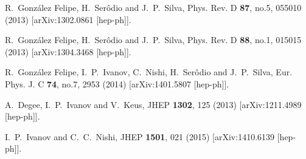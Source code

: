 \documentclass[11pt]{article}
\begin{document}
\begin{thebibliography}{99}
R.~González Felipe, H.~Serôdio and J.~P.~Silva,
Phys. Rev. D \textbf{87}, no.5, 055010 (2013)
[arXiv:1302.0861 [hep-ph]].

R.~González Felipe, H.~Serôdio and J.~P.~Silva,
Phys. Rev. D \textbf{88}, no.1, 015015 (2013)
[arXiv:1304.3468 [hep-ph]].

R.~González Felipe, I.~P.~Ivanov, C.~Nishi, H.~Serôdio and J.~P.~Silva,
Eur. Phys. J. C \textbf{74}, no.7, 2953 (2014)
[arXiv:1401.5807 [hep-ph]].

A.~Degee, I.~P.~Ivanov and V.~Keus,
JHEP {\bf 1302}, 125 (2013)
[arXiv:1211.4989 [hep-ph]].

I.~P.~Ivanov and C.~C.~Nishi,
JHEP {\bf 1501}, 021 (2015)
[arXiv:1410.6139 [hep-ph]].

\end{thebibliography}
\end{document}
